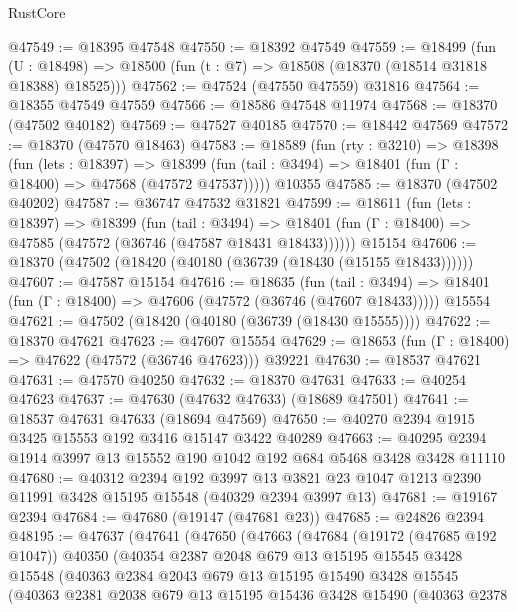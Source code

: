 \begin{lexlean}{RustCore}
\begin{coremodule}
@47549 := @18395 @47548
@47550 := @18392 @47549
@47559 := @18499
    (fun (U : @18498) => @18500 (fun (t : @7) => @18508 (@18370 (@18514 @31818 @18388) @18525)))
@47562 := @47524 (@47550 @47559) @31816
@47564 := @18355 @47549 @47559
@47566 := @18586 @47548 @11974
@47568 := @18370 (@47502 @40182)
@47569 := @47527 @40185
@47570 := @18442 @47569
@47572 := @18370 (@47570 @18463)
@47583 := @18589
    (fun (rty : @3210) =>
    @18398
      (fun (lets : @18397) =>
      @18399 (fun (tail : @3494) => @18401 (fun (Γ : @18400) => @47568 (@47572 @47537)))))
    @10355
@47585 := @18370 (@47502 @40202)
@47587 := @36747 @47532 @31821
@47599 := @18611
    (fun (lets : @18397) =>
    @18399
      (fun (tail : @3494) =>
      @18401 (fun (Γ : @18400) => @47585 (@47572 (@36746 (@47587 @18431 @18433))))))
    @15154
@47606 := @18370 (@47502 (@18420 (@40180 (@36739 (@18430 (@15155 @18433))))))
@47607 := @47587 @15154
@47616 := @18635
    (fun (tail : @3494) => @18401 (fun (Γ : @18400) => @47606 (@47572 (@36746 (@47607 @18433)))))
    @15554
@47621 := @47502 (@18420 (@40180 (@36739 (@18430 @15555))))
@47622 := @18370 @47621
@47623 := @47607 @15554
@47629 := @18653 (fun (Γ : @18400) => @47622 (@47572 (@36746 @47623))) @39221
@47630 := @18537 @47621
@47631 := @47570 @40250
@47632 := @18370 @47631
@47633 := @40254 @47623
@47637 := @47630 (@47632 @47633) (@18689 @47501)
@47641 := @18537 @47631 @47633 (@18694 @47569)
@47650 := @40270 @2394 @1915 @3425 @15553 @192 @3416 @15147 @3422 @40289
@47663 := @40295 @2394 @1914 @3997 @13 @15552 @190 @1042 @192 @684 @5468 @3428 @3428 @11110
@47680 := @40312
    @2394
    @192
    @3997
    @13
    @3821
    @23
    @1047
    @1213
    @2390
    @11991
    @3428
    @15195
    @15548
    (@40329 @2394 @3997 @13)
@47681 := @19167 @2394
@47684 := @47680 (@19147 (@47681 @23))
@47685 := @24826 @2394
@48195 := @47637
    (@47641
      (@47650
        (@47663
          (@47684
            (@19172 (@47685 @192 @1047))
            @40350
            (@40354
              @2387
              @2048
              @679
              @13
              @15195
              @15545
              @3428
              @15548
              (@40363
                @2384
                @2043
                @679
                @13
                @15195
                @15490
                @3428
                @15545
                (@40363
                  @2381
                  @2038
                  @679
                  @13
                  @15195
                  @15436
                  @3428
                  @15490
                  (@40363
                    @2378

\end{coremodule}
\end{lexlean}
